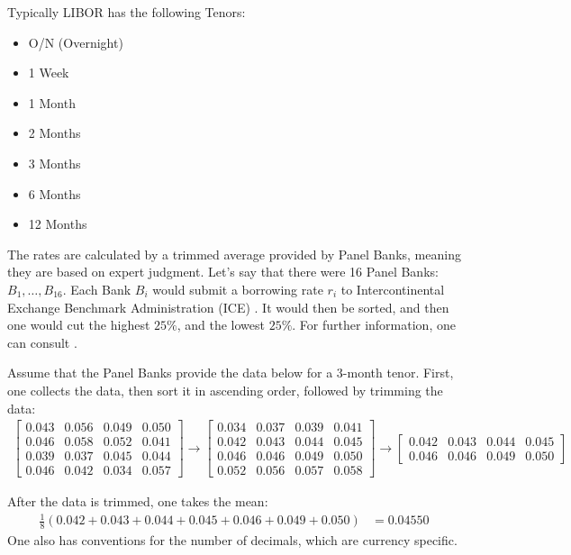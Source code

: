 Typically LIBOR has the following Tenors: 
\begin{itemize}[leftmargin =*]
    \item O/N (Overnight) 
    \item 1 Week 
    \item 1 Month 
    \item 2 Months 
    \item 3 Months 
    \item 6 Months 
    \item 12 Months
\end{itemize}

The rates are calculated by a trimmed average provided by Panel Banks, meaning they are based on expert judgment. Let's say that there were 16 Panel Banks: $B_{1}, \dots, B_{16}$. Each Bank $B_{i}$ would submit a borrowing rate $r_{i}$ to Intercontinental Exchange Benchmark Administration (ICE) . It would then be sorted, and then one would cut the highest $25\%$, and the lowest $25\%$. For further information, one can consult \cite{ICE_IBA}.  

\begin{example}
Assume that the Panel Banks provide the data below for a 3-month tenor. First, one collects the data, then sort it in ascending order, followed by trimming the data: 
\begin{align*}
\begin{bmatrix}
0.043 & 0.056 & 0.049 & 0.050\\
0.046 & 0.058 & 0.052 & 0.041 \\ 
0.039 & 0.037 & 0.045 & 0.044 \\ 
0.046 & 0.042 & 0.034 & 0.057
\end{bmatrix}
\to 
\begin{bmatrix}
0.034 & 0.037 & 0.039 & 0.041\\
0.042 & 0.043 & 0.044 & 0.045 \\ 
0.046 & 0.046 & 0.049 & 0.050 \\ 
0.052 & 0.056 & 0.057 & 0.058
\end{bmatrix} 
\to 
\begin{bmatrix}
0.042 & 0.043 & 0.044 & 0.045 \\ 
0.046 & 0.046 & 0.049 & 0.050 
\end{bmatrix} 
\end{align*}

After the data is trimmed, one takes the mean: 
\begin{align*}
\frac{1}{8}\left(
0.042 + 0.043 + 0.044 + 0.045 + 0.046 + 0.049 + 0.050
\right)
&= 
0.04550
\end{align*}
One also has conventions for the number of decimals, which are currency specific. 
\end{example}


